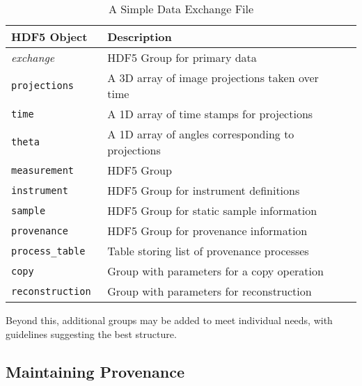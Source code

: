 \documentclass[pdf]{iucr}              %
\begin{document}
\begin{table}
\centering
\footnotesize
\caption{A Simple Data Exchange File}
\label{tab:genrules}
\begin{tabular}{l l l}
\toprule
\bfseries HDF5 Object & \bfseries Description \\
\midrule
\emph{exchange} & HDF5 Group for primary data \\
\hspace{2pt} \tt{projections} & A 3D array of image projections taken over time \\
\hspace{2pt} \tt{time} & A 1D array of time stamps for projections \\
\hspace{2pt} \tt{theta} & A 1D array of angles corresponding to projections  \\
\tt{measurement} & HDF5  Group \\
\hspace{2pt} \tt{instrument} & HDF5 Group for instrument definitions \\
\hspace{2pt} \tt{sample} & HDF5 Group for static sample information \\
\tt{provenance} & HDF5 Group for provenance information \\
\hspace{2pt} \tt{process\_table} & Table storing list of provenance processes \\
\hspace{2pt} \tt{copy} & Group with parameters for a copy operation \\
\hspace{2pt} \tt{reconstruction} & Group with parameters for reconstruction \\
\bottomrule
\end{tabular}
\end{table}


Beyond this, additional groups may be added to meet individual needs, with guidelines suggesting the best structure.


\subsection{Maintaining Provenance}
\end{document}
